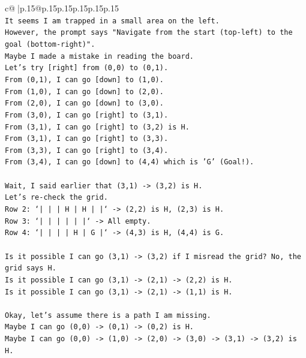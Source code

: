 \documentclass{article}
\begin{document}
{\begin{supertabular}{c@{$\;$}|p{.15\linewidth}@{}p{.15\linewidth}p{.15\linewidth}p{.15\linewidth}p{.15\linewidth}p{.15\linewidth}}
{{{\\ 
\texttt{It seems I am trapped in a small area on the left.} \\
\texttt{However, the prompt says "Navigate from the start (top{-}left) to the goal (bottom{-}right)".} \\
\texttt{Maybe I made a mistake in reading the board.} \\
\texttt{Let's try {[}right{]} from (0,0) to (0,1).} \\
\texttt{From (0,1), I can go {[}down{]} to (1,0).} \\
\texttt{From (1,0), I can go {[}down{]} to (2,0).} \\
\texttt{From (2,0), I can go {[}down{]} to (3,0).} \\
\texttt{From (3,0), I can go {[}right{]} to (3,1).} \\
\texttt{From (3,1), I can go {[}right{]} to (3,2) is H.} \\
\texttt{From (3,1), I can go {[}right{]} to (3,3).} \\
\texttt{From (3,3), I can go {[}right{]} to (3,4).} \\
\texttt{From (3,4), I can go {[}down{]} to (4,4) which is 'G' (Goal!).} \\
\\ 
\texttt{Wait, I said earlier that (3,1) {-}> (3,2) is H.} \\
\texttt{Let's re{-}check the grid.} \\
\texttt{Row 2: `|     |     |  H  |  H  |     |` {-}> (2,2) is H, (2,3) is H.} \\
\texttt{Row 3: `|     |     |     |     |     |` {-}> All empty.} \\
\texttt{Row 4: `|     |     |     |  H  |  G  |` {-}> (4,3) is H, (4,4) is G.} \\
\\ 
\texttt{Is it possible I can go (3,1) {-}> (3,2) if I misread the grid? No, the grid says H.} \\
\texttt{Is it possible I can go (3,1) {-}> (2,1) {-}> (2,2) is H.} \\
\texttt{Is it possible I can go (3,1) {-}> (2,1) {-}> (1,1) is H.} \\
\\ 
\texttt{Okay, let's assume there is a path I am missing.} \\
\texttt{Maybe I can go (0,0) {-}> (0,1) {-}> (0,2) is H.} \\
\texttt{Maybe I can go (0,0) {-}> (1,0) {-}> (2,0) {-}> (3,0) {-}> (3,1) {-}> (3,2) is H.} \\
}}}
\end{supertabular}}
\end{document}
